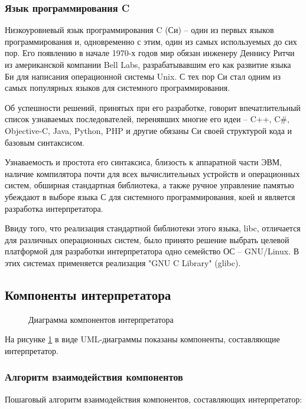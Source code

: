 \subsubsection{Язык программирования C}

Низкоуровневый язык программирования C (Си) -- один из первых языков программирования и, одновременно с этим, один из самых используемых до сих пор. Его появлению в начале 1970-х годов мир обязан инженеру Деннису Ритчи из американской компании Bell Labs, разрабатывавшим его как развитие языка Би для написания операционной системы Unix. С тех пор Си стал одним из самых популярных языков для системного программирования.

Об успешности решений, принятых при его разработке, говорит впечатлительный список узнаваемых последователей, перенявших многие его идеи -- C++, C\#, Objective-C, Java, Python, PHP и другие обязаны Си своей структурой кода и базовым синтаксисом.

Узнаваемость и простота его синтаксиса, близость к аппаратной части ЭВМ, наличие компилятора почти для всех вычислительных устройств и операционных систем, обширная стандартная библиотека, а также ручное управление памятью убеждают в выборе языка С для системного программирования, коей и является разработка интерпретатора.

Ввиду того, что реализация стандартной библиотеки этого языка, libc, отличается для различных операционных систем, было принято решение выбрать целевой платформой для разработки интерпретатора одно семейство ОС -- GNU/Linux. В этих системах применяется реализация "GNU C Library" (glibc).


\subsection{Компоненты интерпретатора}

\begin{figure}[ht]
	\caption{Диаграмма компонентов интерпретатора}
	\label{kompdiagram:image}
\end{figure}

На рисунке \ref{kompdiagram:image} в виде UML-диаграммы показаны компоненты, составляющие интерпретатор.



\subsubsection{Алгоритм взаимодействия компонентов}
Пошаговый алгоритм взаимодействия компонентов, составляющих интерпретатор:

